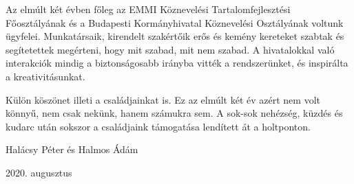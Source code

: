 Az elmúlt két évben főleg az EMMI Köznevelési Tartalomfejlesztési Főosztályának és a Budapesti Kormányhivatal Köznevelési Osztályának voltunk ügyfelei. Munkatársaik, kirendelt szakértőik erős és kemény kereteket szabtak és segítetettek megérteni, hogy mit szabad, mit nem szabad. A hivatalokkal való interakciók mindig a biztonságosabb irányba vitték a rendszerünket, és inspirálta a kreativitásunkat. 
 
Külön köszönet illeti a családjainkat is. Ez az elmúlt két év azért nem volt könnyű, nem csak nekünk, hanem számukra sem. A sok-sok nehézség, küzdés és kudarc után sokszor a családjaink támogatása lendített át a holtponton. 


\bigskip
{
\raggedright Halácsy Péter és Halmos Ádám\\
\raggedright 2020. augusztus
}
